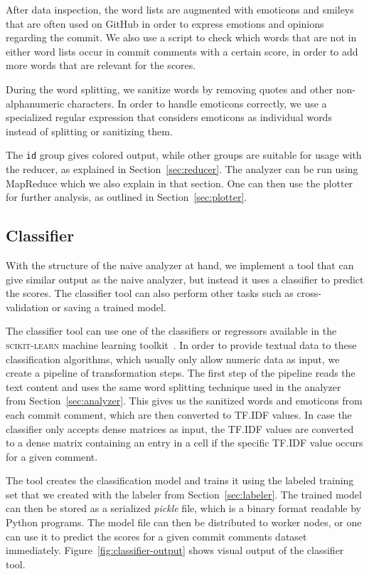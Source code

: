 \documentclass{article}
\begin{document}
After data inspection, the word lists are augmented with emoticons and smileys 
that are often used on GitHub in order to express emotions and opinions 
regarding the commit. We also use a script to check which words that are not 
in either word lists occur in commit comments with a certain score, in order to 
add more words that are relevant for the scores.

During the word splitting, we sanitize words by removing quotes and other 
non-alphanumeric characters. In order to handle emoticons correctly, we use 
a specialized regular expression that considers emoticons as individual words 
instead of splitting or sanitizing them.

The {\tt id} group gives colored output, while other groups are suitable for 
usage with the reducer, as explained in Section~\ref{sec:reducer}. The analyzer
can be run using MapReduce which we also explain in that section. One can then
use the plotter for further analysis, as outlined in Section~\ref{sec:plotter}.

\subsection{Classifier}\label{sec:classifier}
With the structure of the naive analyzer at hand, we implement a tool that can 
give similar output as the naive analyzer, but instead it uses a classifier to
predict the scores. The classifier tool can also perform other tasks such as 
cross-validation or saving a trained model.

The classifier tool can use one of the classifiers or regressors available in
the \textsc{scikit-learn} machine learning toolkit~\cite{scikit-learn}. In 
order to provide textual data to these classification algorithms, which usually 
only allow numeric data as input, we create a pipeline of transformation steps. 
The first step of the pipeline reads the text content and uses the same word 
splitting technique used in the analyzer from Section~\ref{sec:analyzer}. This 
gives us the sanitized words and emoticons from each commit comment, which are 
then converted to TF.IDF values. In case the classifier only accepts dense 
matrices as input, the TF.IDF values are converted to a dense matrix containing 
an entry in a cell if the specific TF.IDF value occurs for a given comment.

The tool creates the classification model and trains it using the labeled 
training set that we created with the labeler from Section~\ref{sec:labeler}. 
The trained model can then be stored as a serialized \emph{pickle} file, which 
is a binary format readable by Python programs. The model file can then be 
distributed to worker nodes, or one can use it to predict the scores for 
a given commit comments dataset immediately.
Figure~\ref{fig:classifier-output} shows visual output of the classifier tool.
\end{document}

